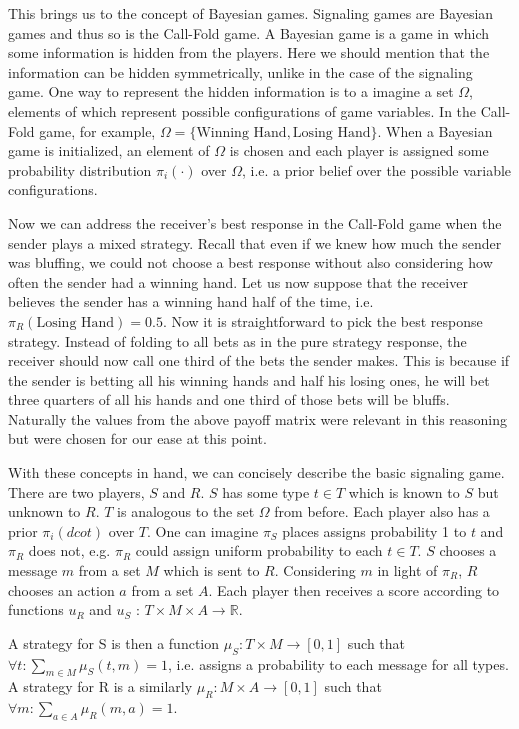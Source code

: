 \documentclass{article}
\begin{document}
This brings us to the concept of Bayesian games. Signaling games are Bayesian games and thus so is the Call-Fold game. A Bayesian game is a game in which some information is hidden from the players. Here we should mention that the information can be hidden symmetrically, unlike in the case of the signaling game. One way to represent the hidden information is to a imagine a set $\Omega$, elements of which represent possible configurations of game variables. In the Call-Fold game, for example, $\Omega = \{\text{Winning Hand}, \text{Losing Hand}\}$. When a Bayesian game is initialized, an element of $\Omega$ is chosen and each player is assigned some probability distribution $\pi_{i}(\cdot)$ over $\Omega$, i.e. a prior belief over the possible variable configurations.

Now we can address the receiver's best response in the Call-Fold game when the sender plays a mixed strategy. Recall that even if we knew how much the sender was bluffing, we could not choose a best response without also considering how often the sender had a winning hand. Let us now suppose that the receiver believes the sender has a winning hand half of the time, i.e. $\pi_R(\text{Losing Hand}) = 0.5$. Now it is straightforward to pick the best response strategy. Instead of folding to all bets as in the pure strategy response, the receiver should now call one third of the bets the sender makes. This is because if the sender is betting all his winning hands and half his losing ones, he will bet three quarters of all his hands and one third of those bets will be bluffs. Naturally the values from the above payoff matrix were relevant in this reasoning but were chosen for our ease at this point.

With these concepts in hand, we can concisely describe the basic signaling game. There are two players, $S$ and $R$. $S$ has some type $t \in T$ which is known to $S$ but unknown to $R$. $T$ is analogous to the set $\Omega$ from before. Each player also has a prior $ \pi_i(dcot)$ over $T$. One can imagine $\pi_{S}$ places assigns probability 1 to $t$ and $\pi_{R}$ does not, e.g. $\pi_{R}$ could assign uniform probability to each $t \in T$. $S$ chooses a message $m$ from a set $M$ which is sent to $R$. Considering $m$ in light of $\pi_R$, $R$ chooses an action $a$ from a set $A$. Each player then receives a score according to functions $u_R$ and $u_S$ : $T \times M \times A \to \mathbb{R}$.

A strategy for S is then a function $\mu_{S}: T \times M \to [0,1]$ such that $\forall t: \sum_{m \in M} \mu_{S}(t, m) = 1$, i.e. assigns a probability to each message for all types. A strategy for R is a similarly $\mu_{R} : M \times A \to [0,1]$ such that $\forall m: \sum_{a \in A} \mu_{R}(m,a) = 1$.
\end{document}
